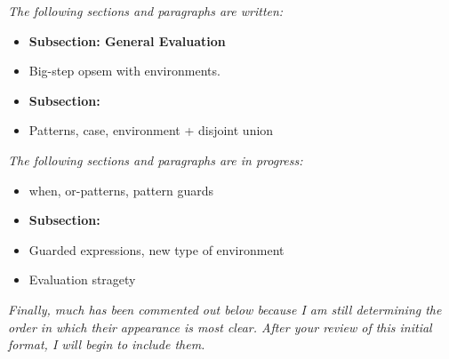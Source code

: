 \documentclass[manuscript,screen,review, 12pt]{acmart}
\begin{document}


\it{The following sections and paragraphs are written:}

\begin{itemize}
    \item \bf{Subsection: General Evaluation}
    \item Big-step opsem with environments. 
    \item \bf{Subsection: {\PPlus}}
    \item Patterns, case, environment + disjoint union 
\end{itemize}

\it{The following sections and paragraphs are in progress:}
\begin{itemize}
    \item when, or-patterns, pattern guards 
    \item \bf{Subsection: {\VMinus}}
    \item Guarded expressions, new type of environment
    \item Evaluation stragety 
\end{itemize}

\it{Finally, much has been commented out below because I am still determining
    the order in which their appearance is most clear. After your review of this
    initial format, I will begin to include them.}








\end{document}
